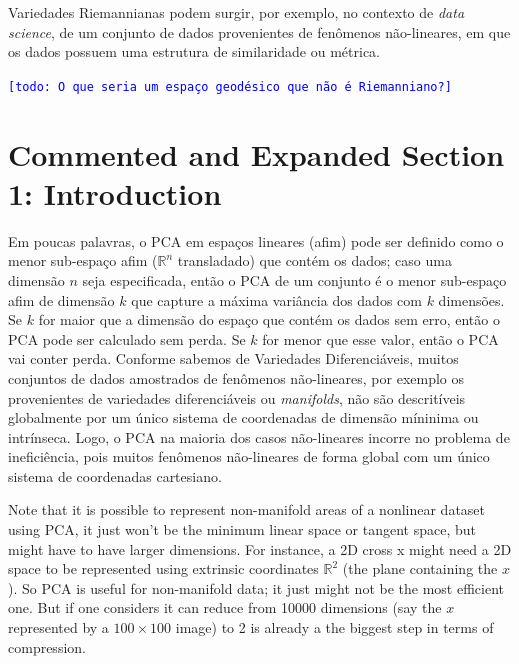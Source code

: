 \documentclass[a4paper,titlepage]{article}
\newcommand{\indraftnote}[1]{\textcolor{blue}{\texttt{\footnotesize [#1]}}}
\newcommand{\todo}[1]{\indraftnote{todo: #1}} %
\begin{document}
Variedades Riemannianas podem surgir, por exemplo, no contexto de \emph{data science}, de um conjunto de dados
provenientes de fenômenos não-lineares, em que os dados possuem uma estrutura de
similaridade ou métrica.

\todo{O que seria um espaço geodésico que não é Riemanniano?}

{
\vspace{1em}
\vspace{1em}
}

\section{Commented and Expanded Section 1: Introduction}

{
\vspace{1em}
\vspace{1em}
}

Em poucas palavras, o PCA em espaços lineares (afim) pode ser definido
como o menor sub-espaço afim ($\mathbb R^n$ transladado) que contém os dados;
caso uma dimensão $n$ seja especificada, então o PCA de um conjunto é 
o menor sub-espaço afim de dimensão $k$ que capture a máxima variância dos dados
com $k$ dimensões. Se $k$ for maior que a dimensão do espaço que contém os dados
sem erro, então o PCA pode ser calculado sem perda. Se $k$ for menor que esse
valor, então o PCA vai conter perda. Conforme sabemos de Variedades
Diferenciáveis, muitos conjuntos de dados amostrados de fenômenos não-lineares,
por exemplo os provenientes de variedades diferenciáveis ou \emph{manifolds},
não são descritíveis globalmente por um único sistema de coordenadas de dimensão
míninima ou intrínseca. Logo, o PCA na maioria dos casos não-lineares incorre no
problema de ineficiência, pois muitos fenômenos não-lineares de forma global
com um único sistema de coordenadas cartesiano.

Note that it is possible to represent non-manifold areas of a nonlinear dataset
using PCA, it just won't be the minimum linear space or tangent space, but might
have to have larger dimensions. For instance, a 2D cross x might need a 2D space
to be represented using extrinsic coordinates $\mathbb R^2$ (the plane
containing the $x$). So PCA is useful for non-manifold data; it just might not
be the most efficient one. But if one considers it can reduce from 10000
dimensions (say the $x$ represented by a $100\times100$ image) to 2 is already a
the biggest step in terms of compression.
\end{document}
